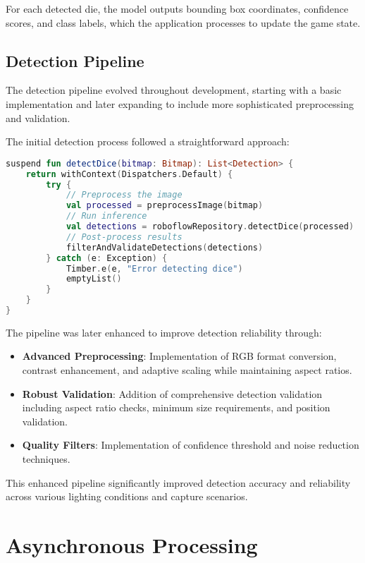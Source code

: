 For each detected die, the model outputs bounding box coordinates, confidence scores, and class labels, which the application processes to update the game state.

\subsection{Detection Pipeline}

The detection pipeline evolved throughout development, starting with a basic implementation and later expanding to include more sophisticated preprocessing and validation.

The initial detection process followed a straightforward approach:
\begin{lstlisting}[language=Kotlin, caption={Initial Dice Detection Pipeline}, label=lst:initial_dice_detection]
suspend fun detectDice(bitmap: Bitmap): List<Detection> {
    return withContext(Dispatchers.Default) {
        try {
            // Preprocess the image
            val processed = preprocessImage(bitmap)
            // Run inference
            val detections = roboflowRepository.detectDice(processed)
            // Post-process results
            filterAndValidateDetections(detections)
        } catch (e: Exception) {
            Timber.e(e, "Error detecting dice")
            emptyList()
        }
    }
}
\end{lstlisting}

The pipeline was later enhanced to improve detection reliability through:
\begin{itemize}
    \item \textbf{Advanced Preprocessing}: Implementation of RGB format conversion, contrast enhancement, and adaptive scaling while maintaining aspect ratios.
    \item \textbf{Robust Validation}: Addition of comprehensive detection validation including aspect ratio checks, minimum size requirements, and position validation.
    \item \textbf{Quality Filters}: Implementation of confidence threshold and noise reduction techniques.
\end{itemize}

This enhanced pipeline significantly improved detection accuracy and reliability across various lighting conditions and capture scenarios.

\section{Asynchronous Processing}

